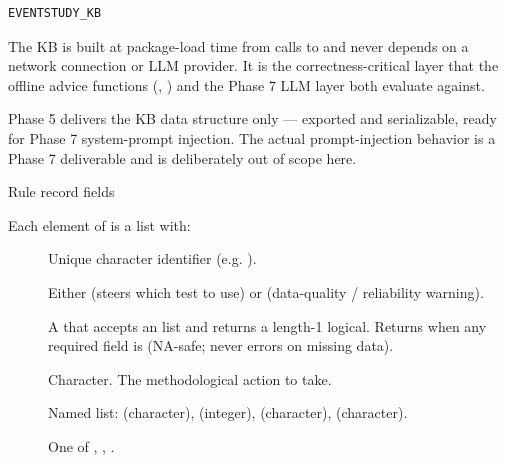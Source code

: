 \documentclass[a4paper]{book}
\begin{document}
%
\begin{Usage}
\begin{verbatim}
EVENTSTUDY_KB
\end{verbatim}
\end{Usage}
%
\begin{Details}
The KB is built at package-load time from calls to  and
never depends on a network connection or LLM provider. It is the
correctness-critical layer that the offline advice functions
(, ) and the
Phase 7 LLM layer both evaluate against.

 Phase 5 delivers the KB data structure
only — exported and serializable, ready for Phase 7 system-prompt
injection. The actual prompt-injection behavior is a Phase 7
deliverable and is deliberately out of scope here.
\end{Details}
%
\begin{Section}{Rule record fields}

Each element of  is a list with:
\begin{description}

\item[] Unique character identifier (e.g. ).
\item[] Either  (steers which test to
use) or  (data-quality / reliability warning).
\item[] A  that accepts an
 list and returns a length-1 logical. Returns
 when any required field is  (NA-safe; never
errors on missing data).
\item[] Character. The methodological action to take.
\item[] Named list:  (character),
 (integer),  (character),  (character).
\item[] One of , ,
.

\end{description}

\end{Section}
%
\end{document}
